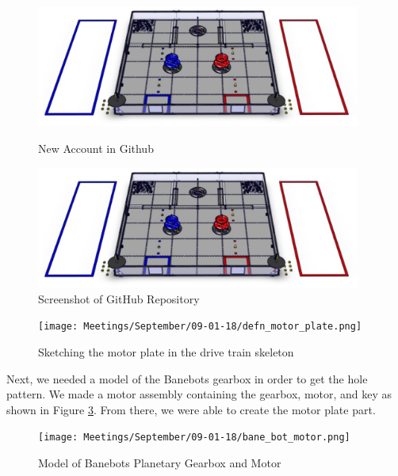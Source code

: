 \begin{figure}[ht]
\centering
\begin{minipage}[b]{.48\textwidth}
  \centering
  \includegraphics[width=0.95\textwidth]{Meetings/September/09-18-21/field.png}
  \caption{New Account in Github}
  \label{fig:pic1}
\end{minipage}%
\hfill%
\begin{minipage}[b]{.48\textwidth}
  \centering
  \includegraphics[width=0.95\textwidth]{Meetings/September/09-18-21/field.png}
  \caption{Screenshot of GitHub Repository}
  \label{fig:pic2}
\end{minipage}
\end{figure}

\begin{figure}[htp]
\centering
\texttt{[image: Meetings/September/09-01-18/defn\_motor\_plate.png]}
\caption{Sketching the motor plate in the drive train skeleton}
\label{fig:motor_plate_skel}
\end{figure}

Next, we needed a model of the Banebots gearbox in order to get the hole pattern. We made a motor assembly containing the gearbox, motor, and key as shown in Figure \ref{fig:banemod}. From there, we were able to create the motor plate part.

\begin{figure}[htp]
\centering
\texttt{[image: Meetings/September/09-01-18/bane\_bot\_motor.png]}
\caption{Model of Banebots Planetary Gearbox and Motor}
\label{fig:banemod}
\end{figure}

